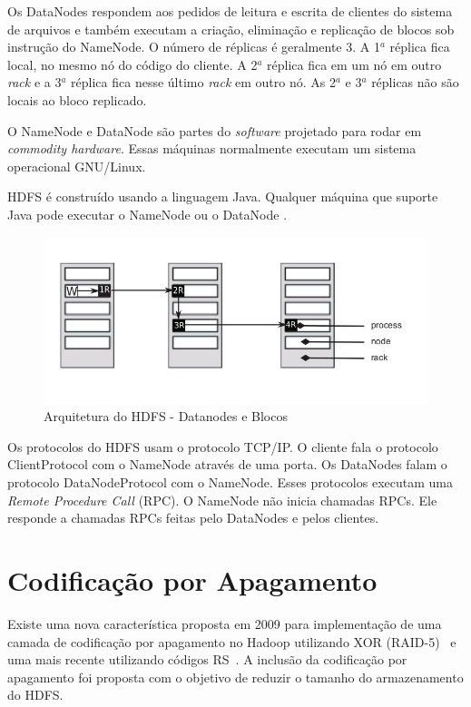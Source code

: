 Os DataNodes respondem aos pedidos de leitura e escrita de clientes do
sistema de arquivos e também executam a criação, eliminação e
replicação de blocos sob instrução do NameNode. O número de réplicas é
geralmente 3. A 1$^a$ réplica fica local, no mesmo nó do código do
cliente. A 2$^a$ réplica fica em um nó em outro \emph{rack} e a 3$^a$
réplica fica nesse último \emph{rack} em outro nó. As 2$^a$ e 3$^a$
réplicas não são locais ao bloco replicado.

O NameNode e DataNode são partes do \emph{software} projetado para
rodar em \emph{commodity hardware}. Essas máquinas normalmente
executam um sistema operacional GNU/Linux.

HDFS é construído usando a linguagem Java. Qualquer máquina que suporte
Java pode executar o NameNode ou o DataNode \cite{Hadoop:2010}.

\vspace*{2cm}
\begin{figure}[h]
  \centering
  \includegraphics[scale=.5]{figuras/HDFS-arquitetura-replicacao-2.jpg}
  \caption{Arquitetura do HDFS - Datanodes e Blocos \cite{White:2009}}
  \label{fig7:hfs}
\end{figure} 

Os protocolos do HDFS usam o protocolo TCP/IP. O cliente fala o
protocolo ClientProtocol com o NameNode através de uma porta. Os
DataNodes falam o protocolo DataNodeProtocol com o NameNode. Esses
protocolos executam uma \emph{Remote Procedure Call} (RPC). O NameNode
não inicia chamadas RPCs. Ele responde a chamadas RPCs feitas pelo
DataNodes e pelos clientes.

\section{Codificação por Apagamento}

Existe uma nova característica proposta em 2009 para implementação de
uma camada de codificação por apagamento no Hadoop utilizando
XOR (RAID-5)~\cite{HDFS-503:2010} e uma mais recente utilizando códigos
RS~\cite{MR-1969:2010}. A inclusão da codificação por apagamento foi proposta com o
objetivo de reduzir o tamanho do armazenamento do HDFS.

